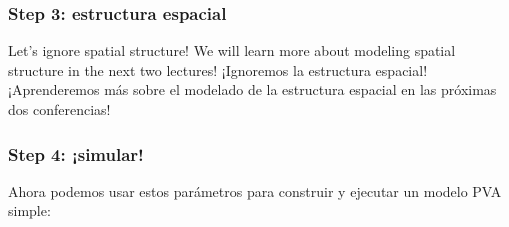 \documentclass[
]{article}
\begin{document}
\hypertarget{step-3-estructura-espacial}{%
\subsubsection{Step 3: estructura
espacial}\label{step-3-estructura-espacial}}

Let's ignore spatial structure! We will learn more about modeling
spatial structure in the next two lectures! ¡Ignoremos la estructura
espacial! ¡Aprenderemos más sobre el modelado de la estructura espacial
en las próximas dos conferencias!

\hypertarget{step-4-simular}{%
\subsubsection{Step 4: ¡simular!}\label{step-4-simular}}

Ahora podemos usar estos parámetros para construir y ejecutar un modelo
PVA simple:
\end{document}
